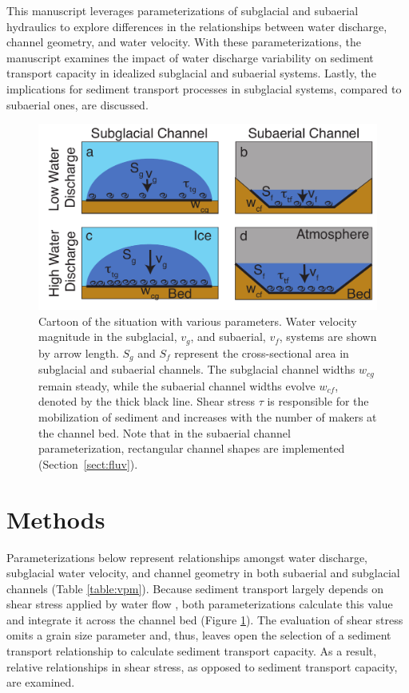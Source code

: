 \documentclass[11pt]{article}
\begin{document}
\begin{spacing}{1}
  This manuscript leverages parameterizations of subglacial and subaerial hydraulics to explore differences in the relationships between  water discharge, channel geometry, and water velocity. 
  With these parameterizations, the manuscript examines the impact of water discharge variability on sediment transport capacity in idealized subglacial and subaerial systems.
  Lastly, the implications for sediment transport processes in subglacial systems, compared to subaerial ones, are discussed.
  
  \begin{center}
    \begin{figure}[H]
      \includegraphics[width=0.65\linewidth]{Cartoon.pdf}
      \caption{Cartoon of the situation with various parameters. Water velocity magnitude in the subglacial, $v_g$, and subaerial, $v_f$, systems are shown by arrow length. $S_g$ and $S_f$ represent the cross-sectional area in subglacial and subaerial channels. The subglacial channel widths $w_{cg}$ remain steady, while the subaerial channel widths evolve $w_{cf}$, denoted by the thick black line. Shear stress $\tau$ is responsible for the mobilization of sediment and increases with the number of makers at the channel bed. 
        Note that in the subaerial channel parameterization, rectangular channel shapes are implemented (Section~\ref{sect:fluv}).} 
      \label{fig:cartoon}
    \end{figure}
  \end{center}


  
  \section{Methods}
  \label{sect:meth}
    Parameterizations below represent relationships amongst water discharge, subglacial water velocity, and channel geometry in both subaerial and subglacial channels (Table \ref{table:vpm}).
  Because sediment transport largely depends on shear stress applied by water flow \citep{shields1936}, both parameterizations calculate this value and integrate  it across the channel bed (Figure \ref{fig:cartoon}).
  The evaluation of shear stress omits a grain size parameter and, thus, leaves open the selection of a sediment transport relationship  \citep[e.g.][]{shields1936,meyer1948} to  calculate sediment transport capacity.
  As a result, relative relationships in shear stress, as opposed to sediment transport capacity, are examined.


\end{spacing}
\end{document}
